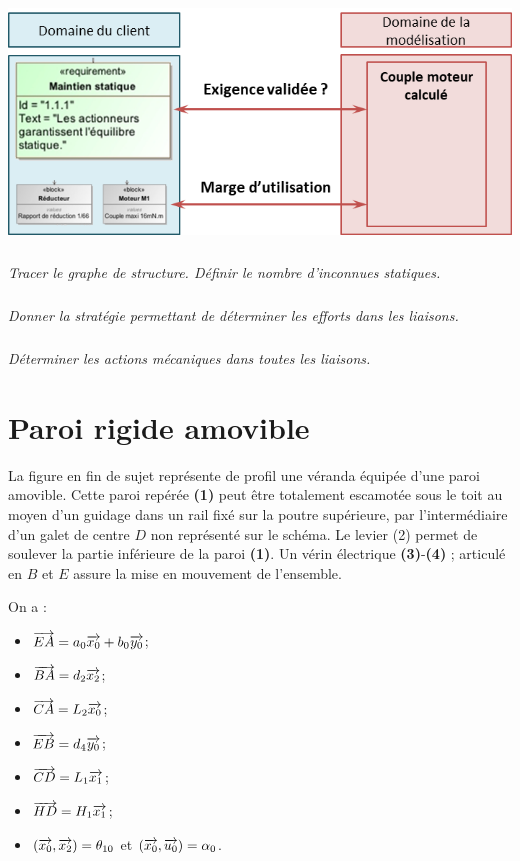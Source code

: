 \documentclass[10pt,fleqn]{article} %
\begin{document}
\begin{multicols}{2}
\begin{center}
\includegraphics[width=\linewidth]{images/fig_06}
\end{center}



\subparagraph{}\textit{Tracer le graphe de structure. Définir le nombre d'inconnues statiques.}

\subparagraph{}\textit{Donner la stratégie permettant de déterminer les efforts dans les liaisons.}

\subparagraph{}\textit{Déterminer les actions mécaniques dans toutes les liaisons.}


\section*{Paroi rigide amovible}
\setcounter{exo}{0}

La figure en fin de sujet représente de profil une véranda équipée d'une paroi amovible. Cette paroi repérée \textbf{(1)} peut être totalement escamotée sous le toit au moyen d'un guidage dans un rail fixé sur la poutre supérieure, par l'intermédiaire d'un galet de centre $D$ non représenté sur le schéma. Le levier (2) permet de soulever la partie inférieure de la paroi \textbf{(1)}. Un vérin électrique \textbf{(3)}-\textbf{(4)} ; articulé en $B$ et $E$ assure la mise en mouvement de l'ensemble.

On a : 
\begin{multicols}{2}
\begin{itemize}
\item $\overrightarrow{EA}=a_0\overrightarrow{x_0} + b_0\overrightarrow{y_0}$;
\item $\overrightarrow{BA}=d_2\overrightarrow{x_2}$;
\item $\overrightarrow{CA}=L_2\overrightarrow{x_0}$;
\item $\overrightarrow{EB}=d_4\overrightarrow{y_0}$;
\item $\overrightarrow{CD}=L_1\overrightarrow{x_1}$;
\item $\overrightarrow{HD}=H_1\overrightarrow{x_1}$;
\item $\left(\overrightarrow{x_0},\overrightarrow{x_2}\right)=\theta_{10}$ et $\left(\overrightarrow{x_0},\overrightarrow{u_0}\right)=\alpha_{0}$.
\end{itemize}
\end{multicols}


\end{multicols}
\end{document}
